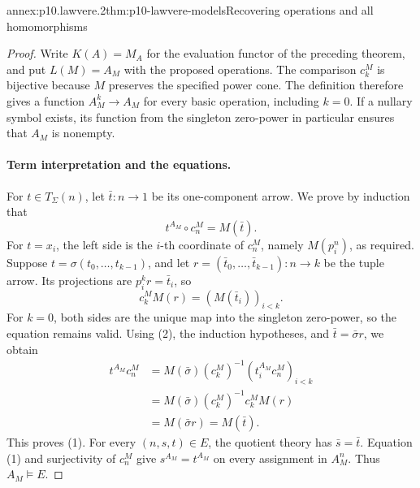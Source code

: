 \begin{annexitem}{annex:p10.lawvere.2}{thm:p10-lawvere-models}{Recovering operations and all homomorphisms}
\begin{proof}
Write \(K(A)=M_A\) for the evaluation functor of the preceding
theorem, and put \(L(M)=A_M\) with the proposed operations.
The comparison \(c_k^M\) is bijective because \(M\) preserves
the specified power cone.  The definition therefore gives a
function \(A_M^k\to A_M\) for every basic operation, including
\(k=0\).
If a nullary symbol exists, its function from the singleton
zero-power in particular ensures that \(A_M\) is nonempty.

\paragraph{Term interpretation and the equations.}
For \(t\in T_\Sigma(n)\), let \(\bar t:n\to1\) be its
one-component arrow.  We prove by induction that
\[
                         t^{A_M}\circ c_n^M=M(\bar t).
                                                                  \tag{1}
\]
For \(t=x_i\), the left side is the \(i\)-th coordinate of
\(c_n^M\), namely \(M(p_i^n)\), as required.
Suppose \(t=\sigma(t_0,\ldots,t_{k-1})\), and let
\(r=(\bar t_0,\ldots,\bar t_{k-1}):n\to k\) be the tuple
arrow.  Its projections are \(p_i^k r=\bar t_i\), so
\[
                       c_k^M M(r)
                           =(M(\bar t_i))_{i<k}.
                                                                  \tag{2}
\]
For \(k=0\), both sides are the unique map into the singleton
zero-power, so the equation remains valid.
Using (2), the induction hypotheses, and
\(\bar t=\bar\sigma r\), we obtain
\[
 \begin{aligned}
 t^{A_M}c_n^M
   &=M(\bar\sigma)(c_k^M)^{-1}
                         (t_i^{A_M}c_n^M)_{i<k}\\
   &=M(\bar\sigma)(c_k^M)^{-1}c_k^M M(r)\\
   &=M(\bar\sigma r)=M(\bar t).
 \end{aligned}
\]
This proves (1).
For every \((n,s,t)\in E\), the quotient theory has
\(\bar s=\bar t\).
Equation (1) and surjectivity of \(c_n^M\) give
\(s^{A_M}=t^{A_M}\) on every assignment in \(A_M^n\).
Thus \(A_M\models E\).


\end{proof}
\end{annexitem}
